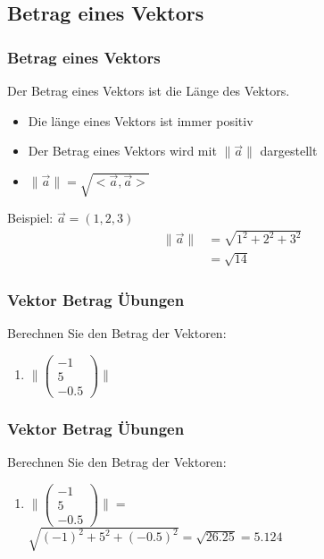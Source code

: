 \subsection{Betrag eines Vektors}
\begin{frame}
    \frametitle{Betrag eines Vektors}
    Der Betrag eines Vektors ist die Länge des Vektors.
    \begin{itemize}
        \item Die länge eines Vektors ist immer positiv
        \item Der Betrag eines Vektors wird mit $\lVert \vec{a} \rVert$ dargestellt
        \item $\lVert \vec{a} \rVert = \sqrt{<\vec{a}, \vec{a}>}$
    \end{itemize}
    Beispiel: $\vec{a} = (1,2,3)$
    \begin{align*}
        \lVert \vec{a} \rVert &= \sqrt{1^2 + 2^2 + 3^2} \\
        &= \sqrt{14}
    \end{align*}
\end{frame}

\begin{frame}
    \frametitle{Vektor Betrag Übungen}
    Berechnen Sie den Betrag der Vektoren:
    \begin{enumerate}
        \item $\lVert \begin{pmatrix}
                          -1 \\ 5 \\ -0.5
        \end{pmatrix} \rVert$
    \end{enumerate}
\end{frame}

\begin{frame}
    \frametitle{Vektor Betrag Übungen}
    Berechnen Sie den Betrag der Vektoren:
    \begin{enumerate}
        \item $\lVert \begin{pmatrix}
                          -1 \\ 5 \\ -0.5
        \end{pmatrix} \rVert = $ \\
        $ $\\
        $ \sqrt{(-1)^2 + 5^2 + (-0.5)^2} = \sqrt{26.25} = 5.124$
    \end{enumerate}
\end{frame}

